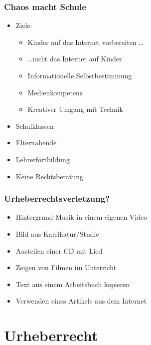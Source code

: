 \documentclass[table]{beamer}
\begin{document}
\begin{frame}
    \frametitle{Chaos macht Schule}
    \begin{itemize}
        \item<2->Ziele:
            \begin{itemize}
                \item<3-> Kinder auf das Internet vorbereiten \ldots
                \item<4-> \ldots nicht das Internet auf Kinder
                \item<5-> Informationelle Selbstbestimmung
                \item<6-> Medienkompetenz
                \item<7-> Kreativer Umgang mit Technik
            \end{itemize}
        \item<8-> Schulklassen
        \item<9-> Elternabende
        \item<10-> Lehrerfortbildung
        \item<11-> Keine Rechtsberatung
    \end{itemize}
\end{frame}

\begin{frame}
    \frametitle{Urheberrechtsverletzung?}
    \begin{itemize}
        \item<2-> Hintergrund-Musik in einem eigenen Video
        \item<3-> Bild aus Karrikatur/Studie
        \item<4-> Austeilen einer CD mit Lied
        \item<5-> Zeigen von Filmen im Unterricht
        \item<6-> Text aus einem Arbeitsbuch kopieren
        \item<7-> Verwenden eines Artikels aus dem Internet
    \end{itemize}
\end{frame}

\section{Urheberrecht}
\end{document}
